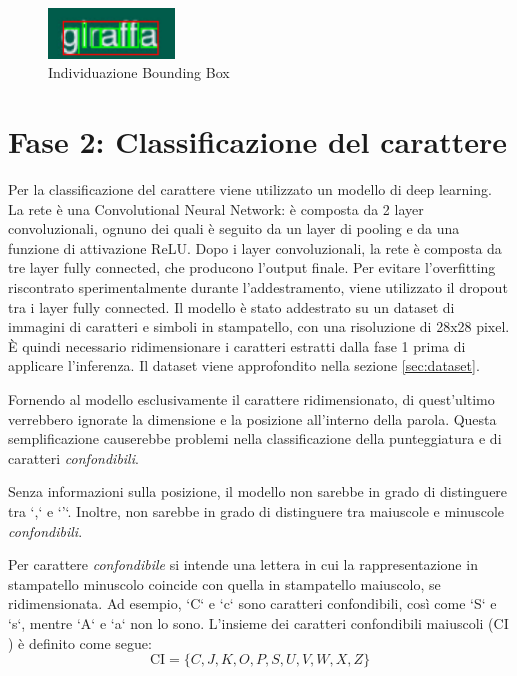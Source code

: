 \begin{figure}[H]
	\centering
	\includegraphics[width=0.3\textwidth]{images/giraffa-bb.jpeg}
	\caption{Individuazione Bounding Box}
	\label{fig:screenshot}
\end{figure}

\section{Fase 2: Classificazione del carattere}

Per la classificazione del carattere viene utilizzato un modello di deep learning. La rete è una Convolutional Neural Network: è composta da 2 layer convoluzionali, ognuno dei quali è seguito da un layer di pooling e da una funzione di attivazione ReLU. Dopo i layer convoluzionali, la rete è composta da tre layer fully connected, che producono l'output finale. Per evitare l'overfitting riscontrato sperimentalmente durante l'addestramento, viene utilizzato il dropout tra i layer fully connected. Il modello è stato addestrato su un dataset di immagini di caratteri e simboli in stampatello, con una risoluzione di 28x28 pixel. È quindi necessario ridimensionare i caratteri estratti dalla fase 1 prima di applicare l'inferenza. Il dataset viene approfondito nella sezione \ref{sec:dataset}.


Fornendo al modello esclusivamente il carattere ridimensionato, di quest'ultimo verrebbero ignorate la dimensione e la posizione all'interno della parola. Questa semplificazione causerebbe problemi nella classificazione della punteggiatura e di caratteri \emph{confondibili}.

Senza informazioni sulla posizione, il modello non sarebbe in grado di distinguere tra `,` e `'`. Inoltre, non sarebbe in grado di distinguere tra maiuscole e minuscole \emph{confondibili}.
\newline

Per carattere \emph{confondibile} si intende una lettera in cui la rappresentazione in stampatello minuscolo coincide con quella in stampatello maiuscolo, se ridimensionata. Ad esempio, `C` e `c` sono caratteri confondibili, così come `S` e `s`, mentre `A` e `a` non lo sono.
L'insieme dei caratteri confondibili maiuscoli ($\text{CI}$) è definito come segue:
$$\text{CI} = \{C, J, K, O, P, S, U, V, W, X, Z\}$$

